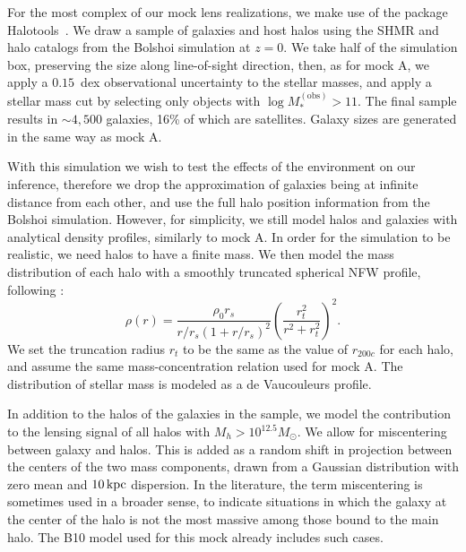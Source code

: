 \documentclass[usenatbib]{mnras}
\def\mobs{M_*^{\mathrm{(obs)}}}
\def\halotools{{\sc Halotools}}
\begin{document}
For the most complex of our mock lens realizations, we make use of the package \halotools\ \citep{Hea++16}.
We draw a sample of galaxies and host halos using the \citet[][B10 from here on]{Beh++10} SHMR and halo catalogs from the Bolshoi simulation at $z=0$. 
We take half of the simulation box, preserving the size along line-of-sight direction, then, as for mock A, we apply a $0.15$~dex observational uncertainty to the stellar masses, and apply a stellar mass cut by selecting only objects with $\log{\mobs} > 11$.
The final sample results in $\sim4,500$ galaxies, 16\% of which are satellites.
Galaxy sizes are generated in the same way as mock A.

With this simulation we wish to test the effects of the environment on our inference, therefore we drop the approximation of galaxies being at infinite distance from each other, and use the full halo position information from the Bolshoi simulation.
However, for simplicity, we still model halos and galaxies with analytical density profiles, similarly to mock A.
In order for the simulation to be realistic, we need halos to have a finite mass.
We then model the mass distribution of each halo with a smoothly truncated spherical NFW profile, following \citet{BMO09}:
\begin{equation}\label{eq:BMO}
\rho(r) = \frac{\rho_0 r_s}{r/r_s (1 + r/r_s)^2}\left(\frac{r_t^2}{r^2 + r_t^2}\right)^2.
\end{equation}
We set the truncation radius $r_t$ to be the same as the value of $r_{200c}$ for each halo, 
and assume the same mass-concentration relation used for mock A.
The distribution of stellar mass is modeled as a de Vaucouleurs profile.

In addition to the halos of the galaxies in the sample, we model the contribution to the lensing signal of all halos with $M_h>10^{12.5}M_\odot$.
We allow for miscentering between galaxy and halos. This is added as a random shift in projection between the centers of the two mass components, drawn from a Gaussian distribution with zero mean and $10\,\rm{kpc}$ dispersion.
In the literature, the term miscentering is sometimes used in a broader sense, to indicate situations in which the galaxy at the center of the halo is not the most massive among those bound to the main halo. The B10 model used for this mock already includes such cases.
\end{document}
